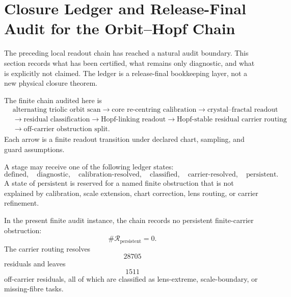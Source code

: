 
\section{Closure Ledger and Release-Final Audit for the Orbit--Hopf Chain}
\label{sec:closure-ledger-release-final-audit}

The preceding local readout chain has reached a natural audit boundary.  This
section records what has been certified, what remains only diagnostic, and what
is explicitly not claimed.  The ledger is a release-final bookkeeping
layer, not a new physical closure theorem.

\begin{definition}
\label{def:finite-orbit-hopf-readout-chain}
The finite chain audited here is
\[
\begin{aligned}
&\text{alternating triolic orbit scan}
\longrightarrow
\text{core re-centring calibration}
\longrightarrow
\text{crystal--fractal readout}\\
&\longrightarrow
\text{residual classification}
\longrightarrow
\text{Hopf-linking readout}
\longrightarrow
\text{Hopf-stable residual carrier routing}\\
&\longrightarrow
\text{off-carrier obstruction split}.
\end{aligned}
\]
Each arrow is a finite readout transition under declared chart, sampling, and
guard assumptions.
\end{definition}

\begin{definition}
\label{def:closure-ledger-states}
A stage may receive one of the following ledger states:
\[
\mathrm{defined},\quad
\mathrm{diagnostic},\quad
\mathrm{calibration\text{-}resolved},\quad
\mathrm{classified},\quad
\mathrm{carrier\text{-}resolved},\quad
\mathrm{persistent}.
\]
A state of \(\mathrm{persistent}\) is reserved for a named finite obstruction
that is not explained by calibration, scale extension, chart correction, lens
routing, or carrier refinement.
\end{definition}

\begin{proposition}
\label{prop:finite-local-ledger-result}
In the present finite audit instance, the chain records no persistent
finite-carrier obstruction:
\[
    \#\mathcal R_{\mathrm{persistent}} = 0.
\]
The carrier routing resolves
\[
    28705
\]
residuals and leaves
\[
    1511
\]
off-carrier residuals, all of which are classified as lens-extreme,
scale-boundary, or missing-fibre tasks.
\end{proposition}

